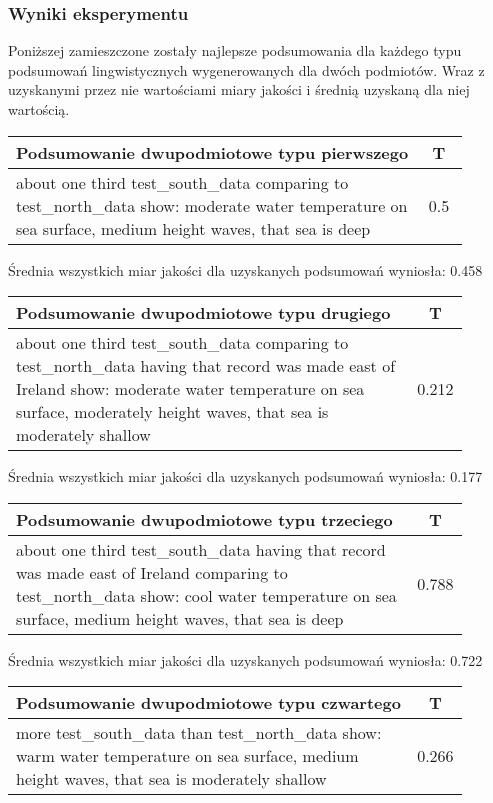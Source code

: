 \documentclass{article}
\begin{document}
\subsubsection{Wyniki eksperymentu}

\noindent Poniższej zamieszczone zostały najlepsze podsumowania dla każdego typu podsumowań lingwistycznych wygenerowanych dla dwóch podmiotów. Wraz z uzyskanymi przez nie wartościami miary jakości i średnią uzyskaną dla niej wartością.

\begin{longtable}{|p{0.9\linewidth}|c|}
\hline
\textbf{Podsumowanie dwupodmiotowe typu pierwszego} & \textbf{T} \\
\hline
about one third test\_south\_data comparing to test\_north\_data show: moderate water temperature on sea surface, medium height waves, that sea is deep & 0.5 \\
\hline
\end{longtable}

\noindent Średnia wszystkich miar jakości dla uzyskanych podsumowań wyniosła: 0.458

\begin{longtable}{|p{0.9\linewidth}|c|}
\hline
\textbf{Podsumowanie dwupodmiotowe typu drugiego} & \textbf{T} \\
\hline
about one third test\_south\_data comparing to test\_north\_data having that record was made east of Ireland show: moderate water temperature on sea surface, moderately height waves, that sea is moderately shallow & 0.212 \\
\hline
\end{longtable}

\noindent Średnia wszystkich miar jakości dla uzyskanych podsumowań wyniosła: 0.177

\begin{longtable}{|p{0.9\linewidth}|c|}
\hline
\textbf{Podsumowanie dwupodmiotowe typu trzeciego} & \textbf{T} \\
\hline
about one third test\_south\_data having that record was made east of Ireland comparing to test\_north\_data show: cool water temperature on sea surface, medium height waves, that sea is deep & 0.788 \\
\hline
\end{longtable}

\noindent Średnia wszystkich miar jakości dla uzyskanych podsumowań wyniosła: 0.722

\begin{longtable}{|p{0.9\linewidth}|c|}
\hline
\textbf{Podsumowanie dwupodmiotowe typu czwartego} & \textbf{T} \\
\hline
more test\_south\_data than test\_north\_data show: warm water temperature on sea surface, medium height waves, that sea is moderately shallow & 0.266 \\
\hline
\end{longtable}
\end{document}
